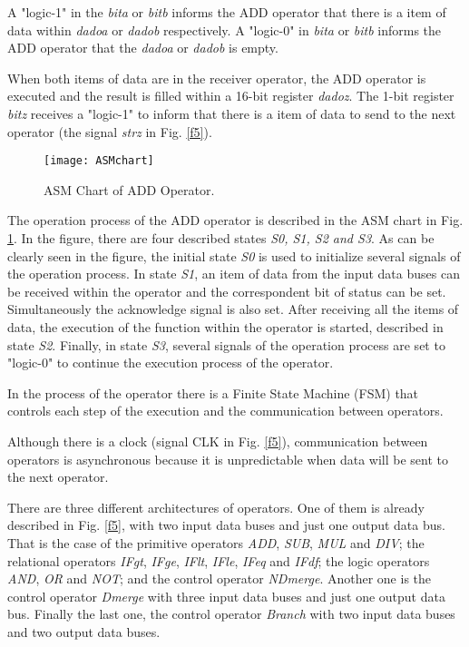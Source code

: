 \documentclass[preprint,12pt]{elsarticle}
\begin{document}
A "logic-1" in the {\it bita} or {\it bitb} informs the ADD operator that there is a item of data within {\it dadoa} or {\it dadob} respectively. A "logic-0" in {\it bita} or {\it bitb} informs the ADD operator that the {\it dadoa} or {\it dadob} is empty.

When both items of data are in the receiver operator, the ADD operator is executed and the result is filled within a 16-bit register {\it dadoz}. The 1-bit register {\it bitz} receives a "logic-1" to inform that there is a item of data to send to the next operator (the signal {\it strz} in Fig. \ref{f5}).


\begin{figure}[h]
\begin{center}
   \texttt{[image: ASMchart]}
   \caption{ASM Chart of ADD Operator.} \label{f6}
\end{center}
\end{figure}

The operation process of the ADD operator is described in the ASM chart in Fig. \ref{f6}. In the figure, there are four described states {\it S0, S1, S2 and S3}. As can be clearly seen in the figure, the initial state {\it S0} is used to initialize several signals of the operation process. In state {\it S1}, an item of data from the input data buses can be received within the operator and the correspondent bit of status can be set. Simultaneously the acknowledge signal is also set. After receiving  all the items of data, the execution of the function within the operator is started, described in state {\it S2}. Finally, in state {\it S3}, several signals of the operation process are set to "logic-0" to continue the execution process of the operator.

In the process of the operator there is a Finite State Machine (FSM) that controls each step of the execution and the communication between operators.

Although there is a clock (signal CLK in Fig. \ref{f5}), communication between operators is asynchronous because it is unpredictable when data will be sent to the next operator.

There are three different architectures of operators. One of them is already described in Fig. \ref{f5}, with two input data buses and just one output data bus. That is the case of the primitive operators {\it ADD}, {\it SUB}, {\it MUL} and {\it DIV}; the relational operators {\it IFgt}, {\it IFge}, {\it IFlt}, {\it IFle}, {\it IFeq} and {\it IFdf}; the logic operators {\it AND}, {\it OR} and {\it NOT}; and the control operator {\it NDmerge}. Another one is the control operator {\it Dmerge} with three input data buses and just one output data bus. Finally the last one, the control operator {\it Branch} with two input data buses and two output data buses.
\end{document}
